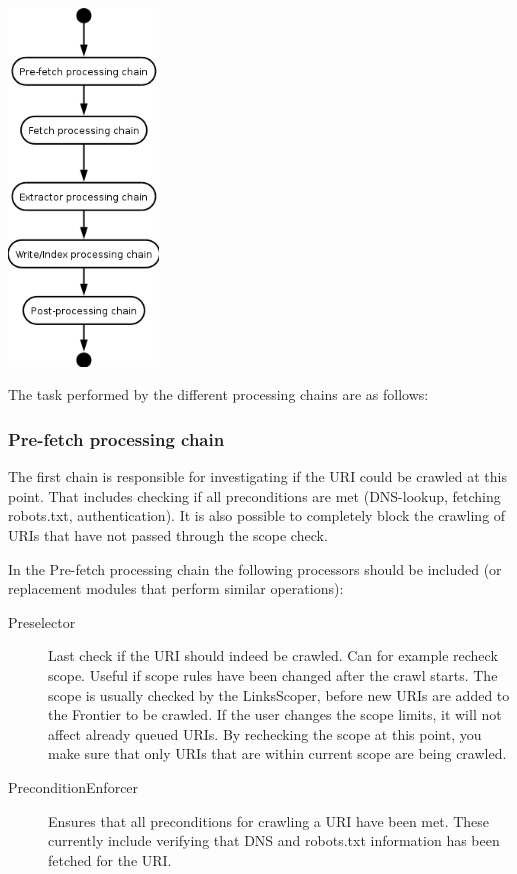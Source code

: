 \documentclass[11pt,a4paper]{article}
\begin{document}
\includegraphics[width=40mm]{processing_steps.png}

The task performed by the different processing chains are as follows:

\subsubsection{Pre-fetch processing chain}
The first chain is responsible for investigating if the URI could be crawled at this point. That includes checking if all preconditions are met (DNS-lookup, fetching robots.txt, authentication). It is also possible to completely block the crawling of URIs that have not passed through the scope check.

In the Pre-fetch processing chain the following processors should be included (or replacement modules that perform similar operations):

\begin{description}
\item[Preselector] Last check if the URI should indeed be crawled. Can for example recheck scope. Useful if scope rules have been changed after the crawl starts. The scope is usually checked by the LinksScoper, before new URIs are added to the Frontier to be crawled. If the user changes the scope limits, it will not affect already queued URIs. By rechecking the scope at this point, you make sure that only URIs that are within current scope are being crawled.
\item[PreconditionEnforcer] Ensures that all preconditions for crawling a URI have been met. These currently include verifying that DNS and robots.txt information has been fetched for the URI.
\end{description}
\end{document}
